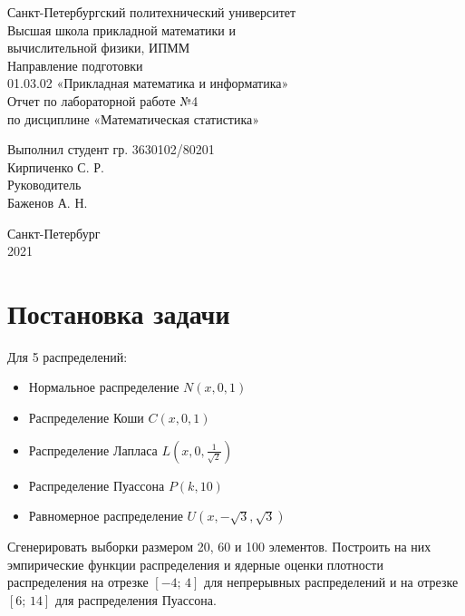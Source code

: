 \documentclass[a4paper,12pt]{article} %
\begin{document}

\large
\begin{center}
    Санкт-Петербургский политехнический университет\\
    Высшая школа прикладной математики и\\вычислительной физики, ИПММ\\
    \vspace{5em}
    Направление подготовки\\
    01.03.02 «Прикладная математика и информатика»\\
    \vspace{3em}
    Отчет по лабораторной работе №4\\
    по дисциплине «Математическая статистика»
    \vspace{15em}
\end{center}
Выполнил студент гр. 3630102/80201\\
Кирпиченко С. Р.\\
Руководитель\\
Баженов А. Н.
\vspace{7em}
\begin{center}
    Санкт-Петербург\\
    2021
\end{center}
\thispagestyle{empty}
\newpage
\tableofcontents
{}
\newpage
\listoffigures
{}
\newpage
\listoftables
{}
\thispagestyle{empty}
\newpage
\section{Постановка задачи}
Для 5 распределений:
\begin{itemize}
    \item Нормальное распределение $N(x, 0, 1)$
    \item Распределение Коши $C(x, 0, 1)$
    \item Распределение Лапласа $L(x, 0, \frac{1}{\sqrt{2}})$
    \item Распределение Пуассона $P(k, 10)$
    \item Равномерное распределение $U(x,-\sqrt{3},\sqrt{3})$
\end{itemize}
Сгенерировать выборки размером 20, 60 и 100 элементов. Построить на них эмпирические функции распределения и ядерные оценки плотности распределения на отрезке $[-4;\,4]$ для непрерывных распределений и на отрезке $[6;\,14]$ для распределения Пуассона.
\end{document}
